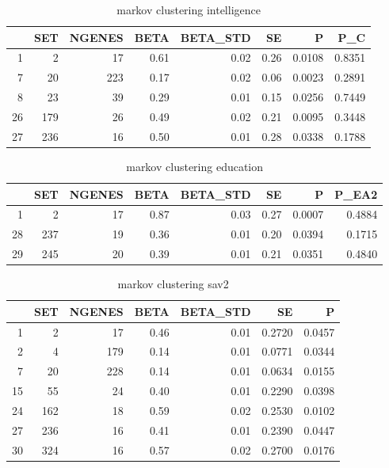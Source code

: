 \begin{table}[ht]
\centering
\begin{tabular}{rrrrrrrr}
  \hline
 & SET & NGENES & BETA & BETA\_STD & SE & P & P\_C \\ 
  \hline
1 &  2 & 17 & 0.61 & 0.02 & 0.26 & 0.0108 & 0.8351 \\ 
  7 & 20 & 223 & 0.17 & 0.02 & 0.06 & 0.0023 & 0.2891 \\ 
  8 & 23 & 39 & 0.29 & 0.01 & 0.15 & 0.0256 & 0.7449 \\ 
  26 & 179 & 26 & 0.49 & 0.02 & 0.21 & 0.0095 & 0.3448 \\ 
  27 & 236 & 16 & 0.50 & 0.01 & 0.28 & 0.0338 & 0.1788 \\ 
   \hline
\end{tabular}
\caption{markov clustering intelligence} 
\label{lab:markov clustering intelligence}
\end{table}
\begin{table}[ht]
\centering
\begin{tabular}{rrrrrrrr}
  \hline
 & SET & NGENES & BETA & BETA\_STD & SE & P & P\_EA2 \\ 
  \hline
1 &  2 & 17 & 0.87 & 0.03 & 0.27 & 0.0007 & 0.4884 \\ 
  28 & 237 & 19 & 0.36 & 0.01 & 0.20 & 0.0394 & 0.1715 \\ 
  29 & 245 & 20 & 0.39 & 0.01 & 0.21 & 0.0351 & 0.4840 \\ 
   \hline
\end{tabular}
\caption{markov clustering education} 
\label{lab:markov clustering education}
\end{table}
\begin{table}[ht]
\centering
\begin{tabular}{rrrrrrr}
  \hline
 & SET & NGENES & BETA & BETA\_STD & SE & P \\ 
  \hline
1 &  2 & 17 & 0.46 & 0.01 & 0.2720 & 0.0457 \\ 
  2 &  4 & 179 & 0.14 & 0.01 & 0.0771 & 0.0344 \\ 
  7 & 20 & 228 & 0.14 & 0.01 & 0.0634 & 0.0155 \\ 
  15 & 55 & 24 & 0.40 & 0.01 & 0.2290 & 0.0398 \\ 
  24 & 162 & 18 & 0.59 & 0.02 & 0.2530 & 0.0102 \\ 
  27 & 236 & 16 & 0.41 & 0.01 & 0.2390 & 0.0447 \\ 
  30 & 324 & 16 & 0.57 & 0.02 & 0.2700 & 0.0176 \\ 
   \hline
\end{tabular}
\caption{markov clustering sav2} 
\label{lab:markov clustering sav2}
\end{table}
